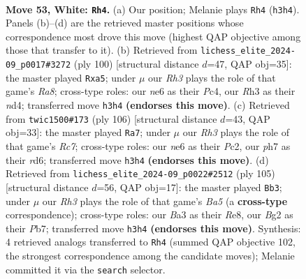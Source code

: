 \documentclass[11pt]{article}
\begin{document}
\clearpage

\begin{figure}[p]\centering
\begin{subfigure}{0.46\textwidth}\centering
\resizebox{\linewidth}{!}{%
\newchessgame
\chessboard[
  setfen={3r1b2/7p/p2pn1k1/P3p2p/2P1P3/BP3P1R/3K2B1/8 w - - 2 53},
  showmover=false,
  pgfstyle=straightmove, color=movearrow, markmove={h3-h4}
]}
\caption{}
\end{subfigure}\hfill
\begin{subfigure}{0.46\textwidth}\centering
\resizebox{\linewidth}{!}{%
\newchessgame
\chessboard[
  setfen={R7/4rk2/2p3p1/p6p/P1Pnp2P/1P6/6P1/3BK3 w - - 0 51},
  showmover=false,
  pgfstyle=straightmove, color=movearrow, markmove={a8-a5}
]}
\caption{}
\end{subfigure}
\\[4pt]
\begin{subfigure}{0.46\textwidth}\centering
\resizebox{\linewidth}{!}{%
\newchessgame
\chessboard[
  setfen={8/2R5/2pr1kbp/p4p2/Pp6/1P1B1KPP/2P5/8 w - - 4 54},
  showmover=false,
  pgfstyle=straightmove, color=movearrow, markmove={c7-a7}
]}
\caption{}
\end{subfigure}\hfill
\begin{subfigure}{0.46\textwidth}\centering
\resizebox{\linewidth}{!}{%
\newchessgame
\chessboard[
  setfen={4r1k1/1p6/2p4p/2P1B1pP/bP2R1P1/P5K1/8/8 b - - 20 53},
  showmover=false,
  pgfstyle=straightmove, color=movearrow, markmove={a4-b3}
]}
\caption{}
\end{subfigure}
\caption{\textbf{Move 53, White: \texttt{Rh4}.} (a) Our position; Melanie plays \texttt{Rh4} (\texttt{h3h4}). Panels (b)--(d) are the retrieved master positions whose correspondence most drove this move (highest QAP objective among those that transfer to it). (b) Retrieved from \texttt{lichess\_elite\_2024-09\_p0017\#3272} (ply 100) [structural distance $d$=47, QAP obj=35]: the master played \texttt{Rxa5}; under $\mu$ our \emph{Rh3} plays the role of that game's \emph{Ra8}; cross-type roles: our \emph{n}e6 as their \emph{P}c4, our \emph{R}h3 as their \emph{n}d4; transferred move \texttt{h3h4} \textbf{(endorses this move)}. (c) Retrieved from \texttt{twic1500\#173} (ply 106) [structural distance $d$=43, QAP obj=33]: the master played \texttt{Ra7}; under $\mu$ our \emph{Rh3} plays the role of that game's \emph{Rc7}; cross-type roles: our \emph{n}e6 as their \emph{P}c2, our \emph{p}h7 as their \emph{r}d6; transferred move \texttt{h3h4} \textbf{(endorses this move)}. (d) Retrieved from \texttt{lichess\_elite\_2024-09\_p0022\#2512} (ply 105) [structural distance $d$=56, QAP obj=17]: the master played \texttt{Bb3}; under $\mu$ our \emph{Rh3} plays the role of that game's \emph{Ba5} (a \textbf{cross-type} correspondence); cross-type roles: our \emph{B}a3 as their \emph{R}e8, our \emph{B}g2 as their \emph{P}b7; transferred move \texttt{h3h4} \textbf{(endorses this move)}. Synthesis: 4 retrieved analogs transferred to \texttt{Rh4} (summed QAP objective 102, the strongest correspondence among the candidate moves); Melanie committed it via the \texttt{search} selector.}
\label{fig:thought-m104}
\end{figure}
\end{document}
